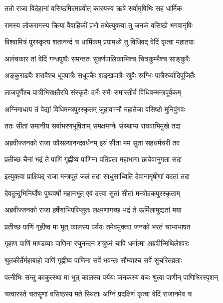 \twolineshloka
{ततो राजा विदेहानां वसिष्ठमिदमब्रवीत्}
{कारयस्व ऋषे सर्वामृषिभिः सह धार्मिक} %

\twolineshloka
{रामस्य लोकरामस्य क्रियां वैवाहिकीं प्रभो}
{तथेत्युक्त्वा तु जनकं वसिष्ठो भगवानृषिः} %

\twolineshloka
{विश्वामित्रं पुरस्कृत्य शतानन्दं च धार्मिकम्}
{प्रपामध्ये तु विधिवद् वेदिं कृत्वा महातपाः} %

\twolineshloka
{अलंचकार तां वेदिं गन्धपुष्पैः समन्ततः}
{सुवर्णपालिकाभिश्च चित्रकुम्भैश्च साङ्कुरैः} %

\twolineshloka
{अङ्कुराढ्यैः शरावैश्च धूपपात्रैः सधूपकैः}
{शङ्खपात्रैः स्रुवैः स्रग्भिः पात्रैरर्घ्यादिपूजितैः} %

\twolineshloka
{लाजपूर्णैश्च पात्रीभिरक्षतैरपि संस्कृतैः}
{दर्भैः समैः समास्तीर्य विधिवन्मन्त्रपूर्वकम्} %

\twolineshloka
{अग्निमाधाय तं वेद्यां विधिमन्त्रपुरस्कृतम्}
{जुहावाग्नौ महातेजा वसिष्ठो मुनिपुंगवः} %

\twolineshloka
{ततः सीतां समानीय सर्वाभरणभूषिताम्}
{समक्षमग्नेः संस्थाप्य राघवाभिमुखे तदा} %

\twolineshloka
{अब्रवीज्जनको राजा कौसल्यानन्दवर्धनम्}
{इयं सीता मम सुता सहधर्मचरी तव} %

\twolineshloka
{प्रतीच्छ चैनां भद्रं ते पाणिं गृह्णीष्व पाणिना}
{पतिव्रता महाभागा छायेवानुगता सदा} %

\twolineshloka
{इत्युक्त्वा प्राक्षिपद् राजा मन्त्रपूतं जलं तदा}
{साधुसाध्विति देवानामृषीणां वदतां तदा} %

\twolineshloka
{देवदुन्दुभिनिर्घोषः पुष्पवर्षो महानभूत्}
{एवं दत्त्वा सुतां सीतां मन्त्रोदकपुरस्कृताम्} %

\twolineshloka
{अब्रवीज्जनको राजा हर्षेणाभिपरिप्लुतः}
{लक्ष्मणागच्छ भद्रं ते ऊर्मिलामुद्यतां मया} %

\twolineshloka
{प्रतीच्छ पाणिं गृह्णीष्व मा भूत् कालस्य पर्ययः}
{तमेवमुक्त्वा जनको भरतं चाभ्यभाषत} %

\twolineshloka
{गृहाण पाणिं माण्डव्याः पाणिना रघुनन्दन}
{शत्रुघ्नं चापि धर्मात्मा अब्रवीन्मिथिलेश्वरः} %

\twolineshloka
{श्रुतकीर्तेर्महाबाहो पाणिं गृह्णीष्व पाणिना}
{सर्वे भवन्तः सौम्याश्च सर्वे सुचरितव्रताः} %

\twolineshloka
{पत्नीभिः सन्तु काकुत्स्था मा भूत् कालस्य पर्ययः}
{जनकस्य वचः श्रुत्वा पाणीन् पाणिभिरस्पृशन्} %

\twolineshloka
{चत्वारस्ते चतसॄणां वसिष्ठस्य मते स्थिताः}
{अग्निं प्रदक्षिणं कृत्वा वेदिं राजानमेव च} %

